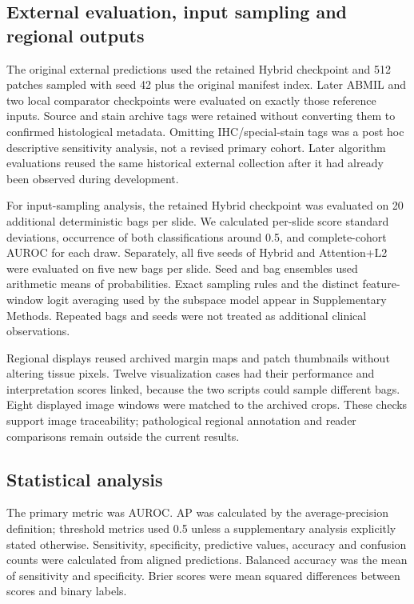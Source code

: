\subsection{External evaluation, input sampling and regional outputs}
The original external predictions used the retained Hybrid checkpoint and 512 patches sampled with seed 42 plus the original manifest index. Later ABMIL and two local comparator checkpoints were evaluated on exactly those reference inputs. Source and stain archive tags were retained without converting them to confirmed histological metadata. Omitting IHC/special-stain tags was a post hoc descriptive sensitivity analysis, not a revised primary cohort. Later algorithm evaluations reused the same historical external collection after it had already been observed during development.

For input-sampling analysis, the retained Hybrid checkpoint was evaluated on 20 additional deterministic bags per slide. We calculated per-slide score standard deviations, occurrence of both classifications around 0.5, and complete-cohort AUROC for each draw. Separately, all five seeds of Hybrid and Attention+L2 were evaluated on five new bags per slide. Seed and bag ensembles used arithmetic means of probabilities. Exact sampling rules and the distinct feature-window logit averaging used by the subspace model appear in Supplementary Methods. Repeated bags and seeds were not treated as additional clinical observations.

Regional displays reused archived margin maps and patch thumbnails without altering tissue pixels. Twelve visualization cases had their performance and interpretation scores linked, because the two scripts could sample different bags. Eight displayed image windows were matched to the archived crops. These checks support image traceability; pathological regional annotation and reader comparisons remain outside the current results.

\subsection{Statistical analysis}
The primary metric was AUROC. AP was calculated by the average-precision definition; threshold metrics used 0.5 unless a supplementary analysis explicitly stated otherwise. Sensitivity, specificity, predictive values, accuracy and confusion counts were calculated from aligned predictions. Balanced accuracy was the mean of sensitivity and specificity. Brier scores were mean squared differences between scores and binary labels.

